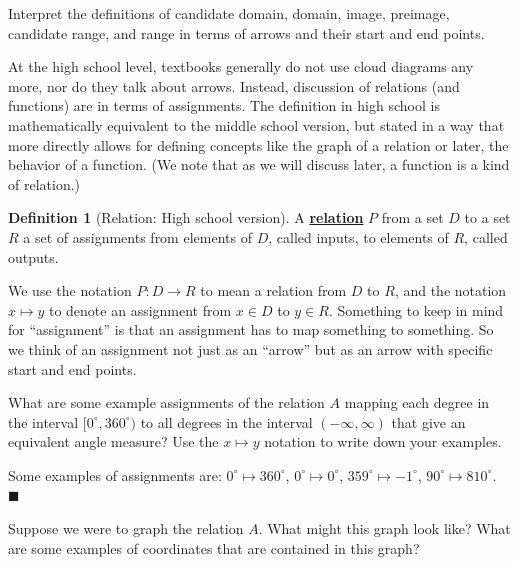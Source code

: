 \documentclass[11pt]{article}
\newenvironment{task}
	{\begin{mdframed}[linecolor=lightgray, linewidth=3pt]\raggedright}
	{\end{mdframed}}
\newcommand\degrees{^\circ}
\renewcommand\emph[1]{\underline{\bf{#1}}} %
\theoremstyle{definition}
\newtheorem{definition}[theorem]{Definition}
\newenvironment{solution}{{\it Solution.} }{\hfill {\color{lightgray}$\blacksquare$}}
\begin{document}
\begin{task}
Interpret the definitions of candidate domain, domain, image, preimage, candidate range, and range in terms of arrows and their start and end points.
\end{task}

At the high school level, textbooks generally do not use cloud diagrams any more, nor do they talk about arrows. Instead, discussion of relations (and functions) are in terms of assignments. The definition in high school is mathematically equivalent to the middle school version, but stated in a way that more directly allows for defining concepts like the graph of a relation or later, the behavior of a function.  (We note that as we will discuss later, a function is a kind of relation.)

\begin{definition}[Relation: High school version]\label{d: relation high school}
A \emph{relation} $P$ from a set $D$ to a set $R$ a set of assignments from elements of $D$, called inputs, to elements of $R$, called outputs.
\end{definition}

\begin{note}
We use the notation $P:D\to R$ to mean a relation from $D$ to $R$, and the notation $x\mapsto y$ to denote an assignment from $x\in D$ to $y\in R$. Something to keep in mind for ``assignment'' is that an assignment has to map something to something. So we think of an assignment not just as an ``arrow'' but as an arrow with specific start and end points.
\end{note}

\begin{task}
What are some example assignments of the relation $A$ mapping each degree in the interval $[0\degrees, 360\degrees)$ to all degrees in the interval $(-\infty,\infty)$ that give an equivalent angle measure? Use the $x\mapsto y$ notation to write down your examples.
\end{task}

\begin{solution}
Some examples of assignments are: $0\degrees \mapsto 360\degrees$, $0\degrees \mapsto 0\degrees$, $359\degrees \mapsto -1\degrees$, $90\degrees \mapsto 810\degrees$.
\end{solution}

\begin{task}
Suppose we were to graph the relation $A$. What might this graph look like? What are some examples of coordinates that are contained in this graph?
\end{task}
\end{document}
